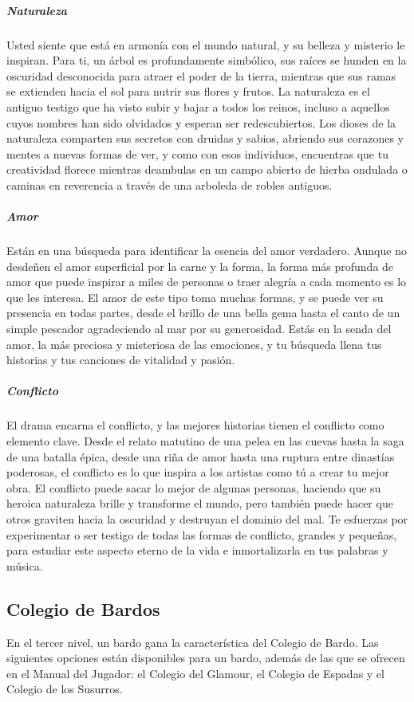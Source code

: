 \documentclass[a4paper,twocolumn,openany,10pt]{dndbook}
\begin{document}
\subparagraph{Naturaleza} Usted siente que está en armonía con el mundo natural, y su belleza y misterio le inspiran. Para ti, un árbol es
profundamente simbólico, sus raíces se hunden en la oscuridad desconocida para atraer el poder de la tierra, mientras que sus ramas se
extienden hacia el sol para nutrir sus flores y frutos. La naturaleza es el antiguo testigo que ha visto subir y bajar a todos los reinos,
incluso a aquellos cuyos nombres han sido olvidados y esperan ser redescubiertos. Los dioses de la naturaleza comparten sus secretos con
druidas y sabios, abriendo sus corazones y mentes a nuevas formas de ver, y como con esos individuos, encuentras que tu creatividad florece
mientras deambulas en un campo abierto de hierba ondulada o caminas en reverencia a través de una arboleda de robles antiguos.

\subparagraph{Amor} Están en una búsqueda para identificar la esencia del amor verdadero. Aunque no desdeñen el amor superficial por la carne
y la forma, la forma más profunda de amor que puede inspirar a miles de personas o traer alegría a cada momento es lo que les interesa. El
amor de este tipo toma muchas formas, y se puede ver su presencia en todas partes, desde el brillo de una bella gema hasta el canto de un
simple pescador agradeciendo al mar por su generosidad. Estás en la senda del amor, la más preciosa y misteriosa de las emociones, y tu
búsqueda llena tus historias y tus canciones de vitalidad y pasión.

\subparagraph{Conflicto} El drama encarna el conflicto, y las mejores historias tienen el conflicto como elemento clave. Desde el relato
matutino de una pelea en las cuevas hasta la saga de una batalla épica, desde una riña de amor hasta una ruptura entre dinastías poderosas,
el conflicto es lo que inspira a los artistas como tú a crear tu mejor obra. El conflicto puede sacar lo mejor de algunas personas, haciendo
que su heroica naturaleza brille y transforme el mundo, pero también puede hacer que otros graviten hacia la oscuridad y destruyan el dominio
del mal. Te esfuerzas por experimentar o ser testigo de todas las formas de conflicto, grandes y pequeñas, para estudiar este aspecto eterno
de la vida e inmortalizarla en tus palabras y música.


\subsection{Colegio de Bardos}
En el tercer nivel, un bardo gana la característica del Colegio de Bardo. Las siguientes opciones están disponibles para un bardo, además de
las que se ofrecen en el Manual del Jugador: el Colegio del Glamour, el Colegio de Espadas y el Colegio de los Susurros. 
\end{document}

